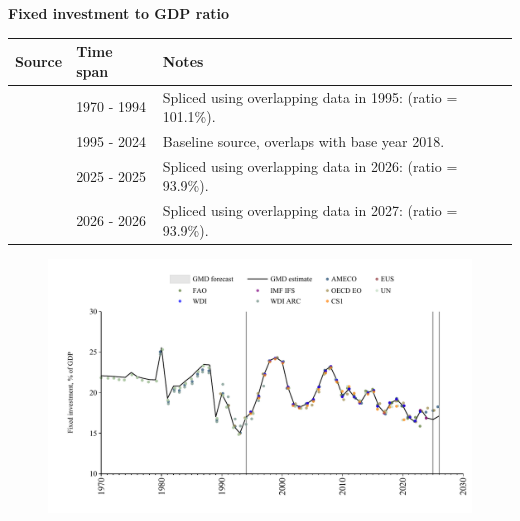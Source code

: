 \documentclass[12pt,a4paper,landscape]{article}
\begin{document}
\begin{adjustbox}{max totalsize={\paperwidth}{\paperheight},center}
\begin{minipage}[t][\textheight][t]{\textwidth}
\vspace*{0.5cm}
{}
\begin{center}
{\Large\bfseries Fixed investment to GDP ratio}
\end{center}
\vspace{0.5cm}
\begin{table}[H]
\centering
\small
\begin{tabular}{|l|l|l|}
\hline
\textbf{Source} & \textbf{Time span} & \textbf{Notes} \\
\hline
\rowcolor{white}\cite{UN}& 1970 - 1994 &Spliced using overlapping data in 1995: (ratio = 101.1\%). \\
\rowcolor{lightgray}\cite{EUS}& 1995 - 2024 &Baseline source, overlaps with base year 2018. \\
\rowcolor{white}\cite{OECD_EO}& 2025 - 2025 &Spliced using overlapping data in 2026: (ratio = 93.9\%). \\
\rowcolor{lightgray}\cite{AMECO}& 2026 - 2026 &Spliced using overlapping data in 2027: (ratio = 93.9\%). \\
\hline
\end{tabular}
\end{table}
\begin{figure}[H]
\centering
\includegraphics[width=\textwidth,height=0.6\textheight,keepaspectratio]{graphs/POL_finv_GDP.pdf}
\end{figure}
\end{minipage}
\end{adjustbox}
\end{document}
